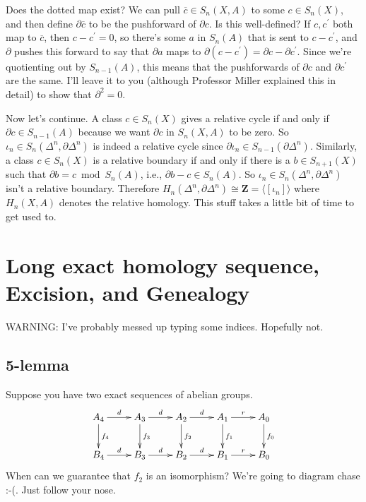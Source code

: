 \documentclass{amsart}
\theoremstyle{theorem}
\theoremstyle{definition}
\begin{document}
Does the dotted map exist? We can pull $\overline{c}\in S_n(X,A)$ to some $c\in S_n(X)$, and then define $\partial\overline{c}$ to be the pushforward of $\partial c$. Is this well-defined? If $c,c^\prime$ both map to $\overline{c}$, then $c-c^\prime=0$, so there's some $a$ in $S_n(A)$ that is sent to $c-c^\prime$, and $\partial$ pushes this forward to say that $\partial a$ maps to $\partial(c-c^\prime)=\partial c-\partial c^\prime$. Since we're quotienting out by $S_{n-1}(A)$, this means that the pushforwards of $\partial c$ and $\partial c^\prime$ are the same. I'll leave it to you (although Professor Miller explained this in detail) to show that $\partial^2=0$. 

Now let's continue. A class $c\in S_n(X)$ gives a relative cycle if and only if $\partial c\in S_{n-1}(A)$ because we want $\partial c$ in $S_n(X,A)$ to be zero. So $\iota_n\in S_n(\Delta^n,\partial\Delta^n)$ is indeed a relative cycle since $\partial\iota_n\in S_{n-1}(\partial\Delta^n)$. Similarly, a class $c\in S_n(X)$ is a relative boundary if and only if there is a $b\in S_{n+1}(X)$ such that $\partial b=c\bmod S_n(A)$, i.e., $\partial b-c\in S_n(A)$. So $\iota_n\in S_n(\Delta^n,\partial\Delta^n)$ isn't a relative boundary. Therefore $ H_n(\Delta^n,\partial\Delta^n)\cong\mathbf{Z}=\langle[\iota_n]\rangle$ where $ H_n(X,A)$ denotes the relative homology. This stuff takes a little bit of time to get used to.
\section{Long exact homology sequence, Excision, and Genealogy}
WARNING: I've probably messed up typing some indices. Hopefully not.
\subsection{5-lemma}
Suppose you have two exact sequences of abelian groups.
\begin{equation*}
\xymatrix{A_4\ar[r]^d\ar[d]^{f_4} & A_3\ar[r]^d\ar[d]^{f_3} & A_2\ar[r]^d\ar[d]^{f_2} & A_1\ar[r]^r\ar[d]^{f_1} & A_0\ar[d]^{f_0}\\
B_4\ar[r]^d & B_3\ar[r]^d & B_2\ar[r]^d & B_1\ar[r]^r & B_0}
\end{equation*}
When can we guarantee that $f_2$ is an isomorphism? We're going to diagram chase :-(. Just follow your nose.
\end{document}
